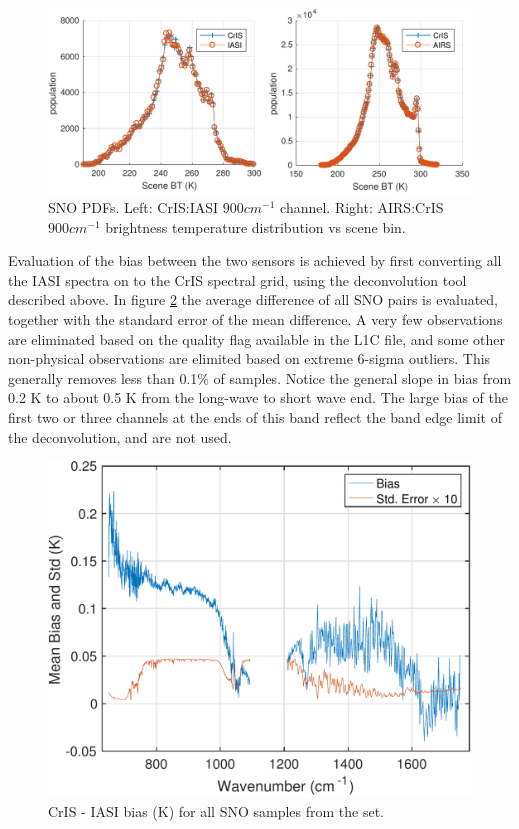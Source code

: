 \documentclass[twocolumn,10pt]{article}
\begin{document}
\begin{figure}[htb]
\centering
\includegraphics[width=\linewidth]{./figs/AC_IC_jplSNO_900wn_hist.pdf}
\caption{
  SNO PDFs. Left: CrIS:IASI $900 cm^{-1}$ channel. Right: AIRS:CrIS $900 cm^{-1}$ brightness temperature distribution vs scene bin.}
\label{fig:X2}
\end{figure}

Evaluation of the bias between the two sensors is achieved by first converting all the
IASI spectra on to the CrIS spectral grid, using the deconvolution tool described above.
In figure \ref{fig:X3} the average difference of all SNO pairs
is evaluated, together with the standard error of the mean difference. A very few
observations are eliminated based on the quality flag available in the L1C file, and some other non-physical observations are elimited based on extreme 6-sigma outliers. This generally removes less than  0.1\%  of samples. Notice the general slope in bias from 0.2 K to about 0.5 K from the long-wave to short wave end. The large bias of the first two or three channels at the ends of this band reflect the band edge limit of the deconvolution, and are not used.

\begin{figure}[htb]
  \centering
  \includegraphics[width=\linewidth]{./figs/fig5_singlecolumn.pdf} 
  \caption{CrIS - IASI bias (K) for all SNO samples from the set.}
  \label{fig:X3}
\end{figure}
\end{document}
